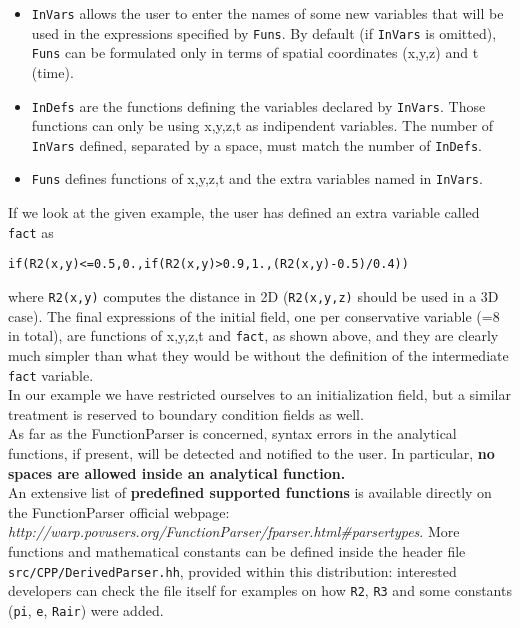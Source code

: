\documentclass[11pt]{article}
\begin{document}
\begin{itemize}
\item
  \texttt{InVars} allows the user to enter the names of some new 
  variables that will be used in the expressions specified by \texttt{Funs}. By
  default (if \texttt{InVars} is omitted), \texttt{Funs} can be
  formulated only in terms of spatial coordinates (x,y,z) and t (time).
\item
  \texttt{InDefs} are the functions defining the variables declared by
  \texttt{InVars}. Those functions can only be using x,y,z,t as 
  indipendent variables. The number of \texttt{InVars} defined, separated
  by a space, must match the number of \texttt{InDefs}.
\item
  \texttt{Funs} defines functions of x,y,z,t and the extra variables
  named in \texttt{InVars}. 
\end{itemize}
If we look at the given example, the user has defined an extra variable called \texttt{fact} as
\begin{verbatim}
if(R2(x,y)<=0.5,0.,if(R2(x,y)>0.9,1.,(R2(x,y)-0.5)/0.4))
\end{verbatim}
where \texttt{R2(x,y)} computes the distance in 2D (\texttt{R2(x,y,z)}
should be used in a 3D case). The final expressions of the initial
field, one per conservative variable (=8 in total), are functions of x,y,z,t and
\texttt{fact}, as shown above, and they are clearly much simpler than what they would
be without the definition of the intermediate \texttt{fact}
variable. \\
In our example we have restricted ourselves to an initialization
field, but a similar treatment is reserved to boundary condition
fields as well. \\
As far as the FunctionParser is concerned, syntax errors in the
analytical functions, if present, will be detected and notified to the
user. In particular, \textbf{no spaces are allowed inside an
  analytical function.} \\
An extensive list of  \textbf{predefined supported functions} is available
directly on the FunctionParser official webpage: 
\textit{http://warp.povusers.org/FunctionParser/fparser.html\#parsertypes}.
More functions and mathematical constants can be defined inside the
header file \texttt{src/CPP/DerivedParser.hh}, provided within this 
distribution: interested developers can check the file itself 
for examples on how \texttt{R2}, \texttt{R3} and some constants
(\texttt{pi}, \texttt{e}, \texttt{Rair}) were added.
\end{document}
